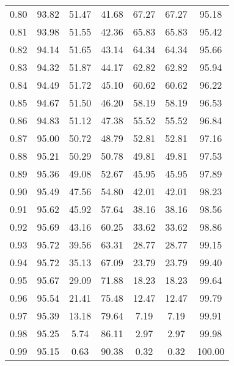 \begin{tabular}{|c|c|c|c|c|c|c|}
      0.80 &     93.82 &     51.47 &      41.68 &   67.27 &      67.27 &         95.18 \\
      0.81 &     93.98 &     51.55 &      42.36 &   65.83 &      65.83 &         95.42 \\
      0.82 &     94.14 &     51.65 &      43.14 &   64.34 &      64.34 &         95.66 \\
      0.83 &     94.32 &     51.87 &      44.17 &   62.82 &      62.82 &         95.94 \\
      0.84 &     94.49 &     51.72 &      45.10 &   60.62 &      60.62 &         96.22 \\
      0.85 &     94.67 &     51.50 &      46.20 &   58.19 &      58.19 &         96.53 \\
      0.86 &     94.83 &     51.12 &      47.38 &   55.52 &      55.52 &         96.84 \\
      0.87 &     95.00 &     50.72 &      48.79 &   52.81 &      52.81 &         97.16 \\
      0.88 &     95.21 &     50.29 &      50.78 &   49.81 &      49.81 &         97.53 \\
      0.89 &     95.36 &     49.08 &      52.67 &   45.95 &      45.95 &         97.89 \\
      0.90 &     95.49 &     47.56 &      54.80 &   42.01 &      42.01 &         98.23 \\
      0.91 &     95.62 &     45.92 &      57.64 &   38.16 &      38.16 &         98.56 \\
      0.92 &     95.69 &     43.16 &      60.25 &   33.62 &      33.62 &         98.86 \\
      0.93 &     95.72 &     39.56 &      63.31 &   28.77 &      28.77 &         99.15 \\
      0.94 &     95.72 &     35.13 &      67.09 &   23.79 &      23.79 &         99.40 \\
      0.95 &     95.67 &     29.09 &      71.88 &   18.23 &      18.23 &         99.64 \\
      0.96 &     95.54 &     21.41 &      75.48 &   12.47 &      12.47 &         99.79 \\
      0.97 &     95.39 &     13.18 &      79.64 &    7.19 &       7.19 &         99.91 \\
      0.98 &     95.25 &      5.74 &      86.11 &    2.97 &       2.97 &         99.98 \\
      0.99 &     95.15 &      0.63 &      90.38 &    0.32 &       0.32 &        100.00 \\
\bottomrule
\end{tabular}
